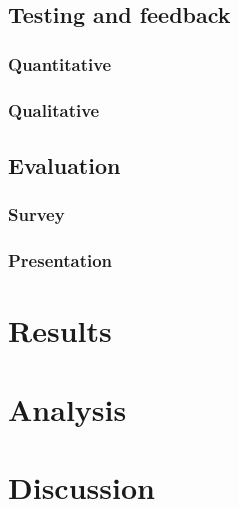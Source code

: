 \documentclass[a4paper,12pt,titlepage]{article}
\begin{document}
\subsection{Testing and feedback}
\subsubsection{Quantitative}
\subsubsection{Qualitative}
\subsection{Evaluation}
\subsubsection{Survey}

\subsubsection{Presentation}

\section{Results}

\section{Analysis}


\section{Discussion}





\end{document}
